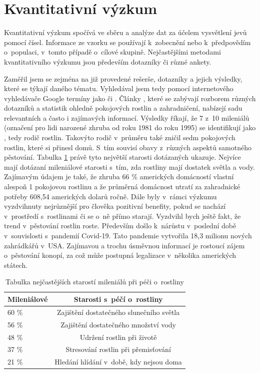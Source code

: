 \documentclass[thesis=M,czech]{FITthesis}[2019/12/23]
\begin{document}
\section{Kvantitativní výzkum}
Kvantitativní výzkum spočívá ve sběru a analýze dat za účelem vysvětlení jevů pomocí čísel. Informace ze vzorku se používají k~zobecnění nebo k~předpovědím o~populaci, v~tomto případě o~cílové skupině. Nejčastějšími metodami kvantitativního výzkumu jsou především dotazníky či různé ankety.

Zaměřil jsem se zejména na již provedené rešerše, dotazníky a jejich výsledky, které se týkají daného tématu. Vyhledával jsem tedy pomocí internetového vyhledávače Google termíny jako  či . Články \cite{quantitative-analysis-1, quantitative-analysis-2}, které se zabývají rozborem různých dotazníků a statistik ohledně pokojových rostlin a zahradničení, nabízejí sadu relevantních a často i zajímavých informací. Výsledky říkají, že 7 z~10 mileniálů (označení pro lidi narozené zhruba od roku 1981 do roku 1995) se identifikují jako , tedy rodič rostlin. Takovýto rodič v~průměru také zničil sedm pokojových rostlin, které si přinesl domů. S~tím souvisí obavy z~různých aspektů samotného pěstování. Tabulka \ref{tab:plant-care-worries} právě tyto největší starosti dotázaných ukazuje. Nejvíce mají dotázaní mileniálové starosti s~tím, zda rostliny mají dostatek světla a vody. Zajímavým údajem je také, že zhruba 66 \% amerických domácností vlastní alespoň 1 pokojovou rostlinu a že průměrná domácnost utratí za zahradnické potřeby 608,54 amerických dolarů ročně. Dále byly v~rámci výzkumu vyzdvihnuty nejrůznější pro člověka pozitivní benefity, pokud se nachází v~prostředí s~rostlinami či se o~ně přímo starají. Vyzdvihl bych ještě fakt, že trend v~pěstování rostlin roste. Především došlo k~nárůstu v~poslední době v~souvislosti s~pandemií Covid-19. Tato pandemie vytvořila 18,3 milionu nových zahrádkářů v~USA. Zajímavou a trochu úsměvnou informací je rostoucí zájem o~pěstování konopí, za což může postupná legalizace v~několika amerických státech.

\begin{table}[]
\begin{tabular}{|l|c|}
\hline
Mileniálové & Starosti s~péčí o~rostliny               \\ \hline
60 \%       & Zajištění dostatečného slunečního světla \\ \hline
56 \%       & Zajištění dostatečného množství vody     \\ \hline
48 \%       & Udržení rostlin při životě               \\ \hline
37 \%       & Stresování rostlin při přemisťování      \\ \hline
21 \%       & Hledání hlídání v~době, kdy nejsou doma  \\ \hline
\end{tabular}
\centering
\caption{Tabulka nejčastějších starostí mileniálů při péči o~rostliny}
\label{tab:plant-care-worries}
\end{table}
\end{document}

